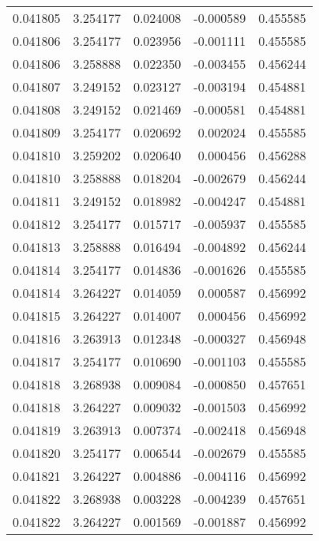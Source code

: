 \begin{tabular}{lrrrr}
0.041805    &  3.254177 &  0.024008 & -0.000589 &             0.455585 \\
0.041806    &  3.254177 &  0.023956 & -0.001111 &             0.455585 \\
0.041806    &  3.258888 &  0.022350 & -0.003455 &             0.456244 \\
0.041807    &  3.249152 &  0.023127 & -0.003194 &             0.454881 \\
0.041808    &  3.249152 &  0.021469 & -0.000581 &             0.454881 \\
0.041809    &  3.254177 &  0.020692 &  0.002024 &             0.455585 \\
0.041810    &  3.259202 &  0.020640 &  0.000456 &             0.456288 \\
0.041810    &  3.258888 &  0.018204 & -0.002679 &             0.456244 \\
0.041811    &  3.249152 &  0.018982 & -0.004247 &             0.454881 \\
0.041812    &  3.254177 &  0.015717 & -0.005937 &             0.455585 \\
0.041813    &  3.258888 &  0.016494 & -0.004892 &             0.456244 \\
0.041814    &  3.254177 &  0.014836 & -0.001626 &             0.455585 \\
0.041814    &  3.264227 &  0.014059 &  0.000587 &             0.456992 \\
0.041815    &  3.264227 &  0.014007 &  0.000456 &             0.456992 \\
0.041816    &  3.263913 &  0.012348 & -0.000327 &             0.456948 \\
0.041817    &  3.254177 &  0.010690 & -0.001103 &             0.455585 \\
0.041818    &  3.268938 &  0.009084 & -0.000850 &             0.457651 \\
0.041818    &  3.264227 &  0.009032 & -0.001503 &             0.456992 \\
0.041819    &  3.263913 &  0.007374 & -0.002418 &             0.456948 \\
0.041820    &  3.254177 &  0.006544 & -0.002679 &             0.455585 \\
0.041821    &  3.264227 &  0.004886 & -0.004116 &             0.456992 \\
0.041822    &  3.268938 &  0.003228 & -0.004239 &             0.457651 \\
0.041822    &  3.264227 &  0.001569 & -0.001887 &             0.456992 \\

\end{tabular}
